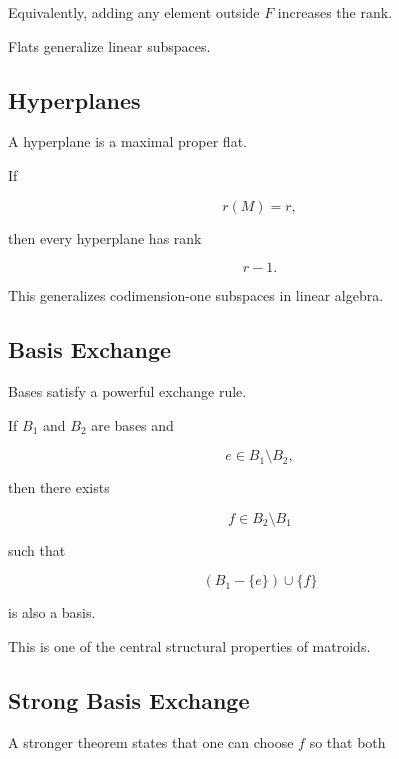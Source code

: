 Equivalently, adding any element outside \(F\) increases the rank.

Flats generalize linear subspaces.

\subsection{Hyperplanes}
\label{subsec:matroid-hyperplanes}

A hyperplane is a maximal proper flat.

If

\[
r(M)=r,
\]

then every hyperplane has rank

\[
\boxed{
r-1.
}
\]

This generalizes codimension-one subspaces in linear algebra.

\subsection{Basis Exchange}
\label{subsec:basis-exchange}

Bases satisfy a powerful exchange rule.

\begin{theorem}
If \(B_1\) and \(B_2\) are bases and

\[
e\in B_1\setminus B_2,
\]

then there exists

\[
f\in B_2\setminus B_1
\]

such that

\[
\boxed{
(B_1-\{e\})\cup\{f\}
}
\]

is also a basis.
\end{theorem}

This is one of the central structural properties of matroids.

\subsection{Strong Basis Exchange}
\label{subsec:strong-basis-exchange}

A stronger theorem states that one can choose \(f\) so that both

